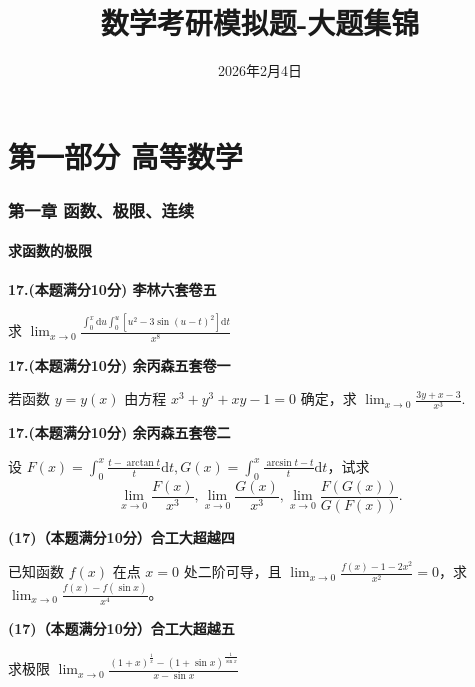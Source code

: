 \documentclass[a4paper,12pt]{article}
\title{数学考研模拟题-大题集锦}
\author{}
\date{2026年2月4日}
\begin{document}
\maketitle

\tableofcontents
\newpage

\part{第一部分 高等数学}

\section{第一章 函数、极限、连续}

\subsection{求函数的极限}

\textbf{17.(本题满分10分) 李林六套卷五}

求 $\lim_{x\to0}\frac{\int_{0}^{x}\mathrm{d}u\int_{0}^{u}\left[u^{2}-3\sin(u-t)^{2}\right]\mathrm{d}t}{x^{8}}$

\vspace{0.5cm}

\textbf{17.(本题满分10分) 余丙森五套卷一}

若函数 $y = y(x)$ 由方程 $x^{3} + y^{3} + xy - 1 = 0$ 确定，求 $\lim_{x \to 0} \frac{3y + x - 3}{x^{3}}$.

\vspace{0.5cm}

\textbf{17.(本题满分10分) 余丙森五套卷二}

设 $F(x)=\int_{0}^{x}\frac{t-\arctan t}{t}\mathrm{d}t,G(x)=\int_{0}^{x}\frac{\arcsin t-t}{t}\mathrm{d}t$，试求
\[ \lim_{x\to0}\frac{F(x)}{x^{3}},\lim_{x\to0}\frac{G(x)}{x^{3}},\lim_{x\to0}\frac{F(G(x))}{G(F(x))}. \]

\vspace{0.5cm}

\textbf{(17)（本题满分10分）合工大超越四}

已知函数 $f(x)$ 在点 $x = 0$ 处二阶可导，且 $\lim_{x \to 0} \frac{f(x) - 1 - 2x^2}{x^2} = 0$，求 $\lim_{x \to 0} \frac{f(x) - f(\sin x)}{x^4}$。

\vspace{0.5cm}

\textbf{(17)（本题满分10分）合工大超越五}

求极限 $\lim_{x\to0}\frac{(1+x)^{\frac{1}{x}}-(1+\sin x)^{\frac{1}{\sin x}}}{x-\sin x}$
\end{document}
